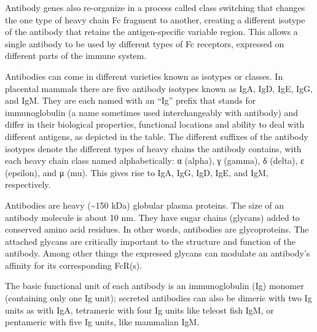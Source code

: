 Antibody genes also re-organize in a process called class switching that changes the one type of heavy chain Fc fragment to another, creating a different isotype of the antibody that retains the antigen-specific variable region. This allows a single antibody to be used by different types of Fc receptors, expressed on different parts of the immune system.

Antibodies can come in different varieties known as isotypes or classes. In placental mammals there are five antibody isotypes known as IgA, IgD, IgE, IgG, and IgM. They are each named with an ``Ig'' prefix that stands for immunoglobulin (a name sometimes used interchangeably with antibody) and differ in their biological properties, functional locations and ability to deal with different antigens, as depicted in the table. The different suffixes of the antibody isotypes denote the different types of heavy chains the antibody contains, with each heavy chain class named alphabetically: α (alpha), γ (gamma), δ (delta), ε (epsilon), and μ (mu). This gives rise to IgA, IgG, IgD, IgE, and IgM, respectively.

Antibodies are heavy (\textasciitilde150 kDa) globular plasma proteins. The size of an antibody molecule is about 10 nm. They have sugar chains (glycans) added to conserved amino acid residues. In other words, antibodies are glycoproteins. The attached glycans are critically important to the structure and function of the antibody. Among other things the expressed glycans can modulate an antibody's affinity for its corresponding FcR(s).

The basic functional unit of each antibody is an immunoglobulin (Ig) monomer (containing only one Ig unit); secreted antibodies can also be dimeric with two Ig units as with IgA, tetrameric with four Ig units like teleost fish IgM, or pentameric with five Ig units, like mammalian IgM.



